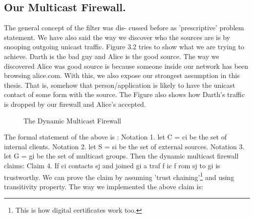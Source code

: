\documentclass[11pt,left=2cm,bottom=2cm,oneside]{book}
\begin{document}
\subsection{Our Multicast Firewall.} The general concept of the filter was dis-
cussed before as 'prescriptive' problem statement. We have also said the way we
discover who the sources are is by snooping outgoing unicast traffic. Figure 3.2 tries
to show what we are trying to achieve. Darth is the bad guy and Alice is the good
source. The way we discovered Alice was good source is because someone inside
our network has been browsing alice.com. With this, we also expose our strongest
assumption in this thesis. That is, somehow that person/application is likely to
have the unicast contact of some form with the source. The Figure also shows how
Darth's traffic is dropped by our firewall and Alice's accepted.
\begin{flushleft}\begin{figure}[H]\caption{The Dynamic Multicast Firewall}\end{figure}\end{flushleft}
The formal statement of the above is :
Notation 1. let C = {ci } be the set of internal clients.
Notation 2. let S = {si } be the set of external sources.
Notation 3. let G = {gi } be the set of multicast groups.
Then the dynamic multicast firewall claims:
Claim 4. If ci contacts sj and joined gi a traf f ic f rom sj to gi is trustworthy.
We can prove the claim by assuming 'trust chaining'\footnote{This is how digital certificates work too.} and using transitivity
property.
The way we implemented the above claim is:
\end{document}
